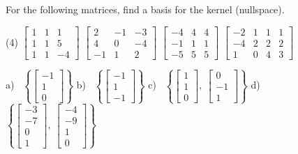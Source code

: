 \begin{exercise}
\pagebreak[2]
For the following matrices, find a basis for the kernel (nullspace).
\begin{tasks}(4)
\task
$\begin{bmatrix}
1 & 1 & 1 \\
1 & 1 & 5 \\
1 & 1 & -4
\end{bmatrix}$
\task
$\begin{bmatrix}
2 & -1 & -3 \\
4 & 0 & -4 \\
-1 & 1 & 2
\end{bmatrix}$
\task
$\begin{bmatrix}
-4 & 4 & 4 \\
-1 & 1 & 1 \\
-5 & 5 & 5
\end{bmatrix}$
\task
$\begin{bmatrix}
-2 & 1 & 1 & 1 \\
-4 & 2 & 2 & 2 \\
1 & 0 & 4 & 3
\end{bmatrix}$
\end{tasks}
\end{exercise}
\comboSol{%
}
{%
a)~ $\left\{\left[\begin{smallmatrix} -1 \\ 1 \\ 0 \end{smallmatrix}\right]\right\}$ \quad b)~ $\left\{ \left[\begin{smallmatrix} -1 \\ 1 \\-1 \end{smallmatrix}\right] \right\}$ \quad c)~ $\left\{\left[\begin{smallmatrix} 1 \\1 \\0 \end{smallmatrix}\right],\ \left[\begin{smallmatrix}  0 \\ -1 \\ 1 \end{smallmatrix}\right]\right\}$ \quad d)~ $\left\{ \left[\begin{smallmatrix} -3 \\ -7 \\ 0 \\ 1 \end{smallmatrix}\right],\ \left[\begin{smallmatrix} -4 \\ -9 \\ 1 \\ 0 \end{smallmatrix}\right]\right\}$
}

